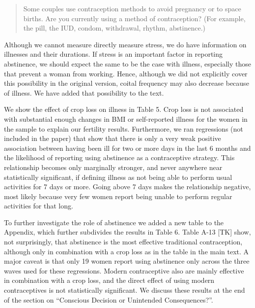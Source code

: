 \documentclass[letterpaper,12pt]{article}
\begin{document}
\begin{enumerate}
\begin{quote}
Some couples use contraception methods to avoid pregnancy or to
space births. Are you currently using a method of contraception?
(For example, the pill, the IUD, condom, withdrawal, rhythm,
abstinence.)
\end{quote}


Although we cannot measure directly measure stress, we do have information 
on illnesses and their durations.
If stress is an important factor in reporting abstinence, we should
expect the same to be the case with illness, especially those that 
prevent a woman from working.
Hence, although we did not explicitly cover this possibility in the original 
version, coital frequency may also decrease because of illness.
We have added that possibility to the text.


We show the effect of crop loss on illness in Table 5.
Crop loss is  not associated with substantial enough changes in BMI or 
self-reported illness for the women in the sample to explain our fertility results.
Furthermore, we ran regressions (not included in the paper) that show that there 
is only a very weak positive association between having been ill for two or more 
days in the last 6 months and the likelihood of reporting using abstinence 
as a contraceptive strategy.
This relationship becomes only marginally stronger, and never anywhere near
statistically significant, if defining illness as not being able to
perform usual activities for 7 days or more.
Going above 7 days makes the relationship negative, most likely because
very few women report being unable to perform regular activities for that
long.

To further investigate the role of abstinence we added a new
table to the Appendix, which further subdivides the results in Table 6.
Table A-13 [TK] show, not surprisingly, that abstinence is the most 
effective traditional contraception, although only in combination 
with a crop loss as in the table in the main text.
A major caveat is that only 19 women report using abstinence only
across the three waves used for these regressions.
Modern contraceptive also are mainly effective in combination with
a crop loss, and the direct effect of using modern contraceptives
is not statistically significant.
We discuss these results at the end of the section on 
``Conscious Decision or Unintended Consequences?''.




\end{enumerate}
\end{document}
